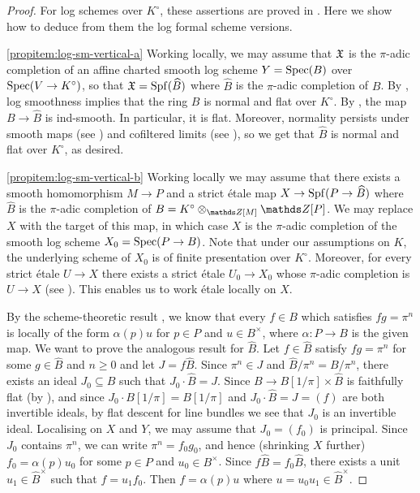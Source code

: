 \begin{proof}
For log schemes over $K^\circ$, these assertions are proved in \cite[\S5]{AHLS-Log}. Here we show how to deduce from them the log formal scheme versions.

\ref{propitem:log-sm-vertical-a}
Working locally, we may assume that ${\mathfrak{X}}$ is the $\pi$-adic completion of an affine charted smooth log scheme $Y = \operatorname{Spec}(B)$ over $\operatorname{Spec}(V\to K^\circ)$, so that ${\mathfrak{X}} = \operatorname{Spf}(\widehat{B})$ where $\widehat{B}$ is the $\pi$-adic completion of $B$. By \cite[Lemma 5.3.4]{AHLS-Log}, log smoothness implies that the ring $B$ is normal and flat over $K^\circ$. 
By \cite[Lemma B.6 + Remark B.7]{GabberZavyalov}, the map $B \to \widehat{B}$ is ind-smooth. In particular, it is flat. Moreover, normality persists under smooth maps (see ) and cofiltered limits (see ), so we get that $\widehat{B}$ is normal and flat over $K^\circ$, as desired.


\ref{propitem:log-sm-vertical-b} Working locally we may assume that there exists a smooth homomorphism $M\to P$ and a strict \'etale map $X\to \operatorname{Spf}(P\to \widehat{B})$ where $\widehat{B}$ is the $\pi$-adic completion of $B = K^\circ\otimes_{\bZ[M]}\bZ[P]$. We may replace $X$ with the target of this map, in which case $X$ is the $\pi$-adic completion of the smooth log scheme $X_0 = \operatorname{Spec}(P\to B)$. Note that under our assumptions on $K$, the underlying scheme of $X_0$ is of finite presentation over $K^\circ$. 
Moreover, for every strict \'etale $U\to X$ there exists a strict \'etale $U_0\to X_0$ whose $\pi$-adic completion is $U\to X$ (see \cite[1.7.3]{HuberBook}). This enables us to work \'etale locally on $X$. 

By the scheme-theoretic result \cite[Proposition~5.3.1]{AHLS-Log}, we know that every $f\in B$ which satisfies $fg = \pi^n$ is locally of the form $\alpha(p)u$ for $p\in P$ and $u\in B^\times$, where $\alpha\colon P\to B$ is the given map. We want to prove the analogous result for $\widehat{B}$. Let $f\in \widehat{B}$ satisfy $fg = \pi^n$ for some $g\in \widehat{B}$ and $n\geq 0$ and let $J = f\widehat{B}$. Since $\pi^n\in J$ and $\widehat{B}/\pi^n = B/\pi^n$, there exists an ideal $J_0\subseteq B$ such that $J_0\cdot \widehat{B} = J$. Since $B\to B[1/\pi]\times\widehat{B}$ is faithfully flat (by  \cite[Chapter~0, Proposition~8.2.17]{FujiwaraKato}), and since $J_0\cdot B[1/\pi] = B[1/\pi]$ and $J_0\cdot \widehat{B} = J = (f)$ are both invertible ideals, by flat descent for line bundles we see that $J_0$ is an invertible ideal. Localising on $X$ and $Y$, we may assume that $J_0 = (f_0)$ is principal. Since $J_0$ contains $\pi^n$, we can write $\pi^n = f_0g_0$, and hence (shrinking $X$ further) $f_0 = \alpha(p)u_0$ for some $p\in P$ and $u_0\in B^\times$. Since $f \widehat{B} = f_0\widehat{B}$, there exists a unit $u_1\in \widehat{B}^\times$ such that $f=u_1 f_0$. Then $f = \alpha(p)u$ where $u=u_0u_1\in \widehat{B}^\times$. 


\end{proof}

